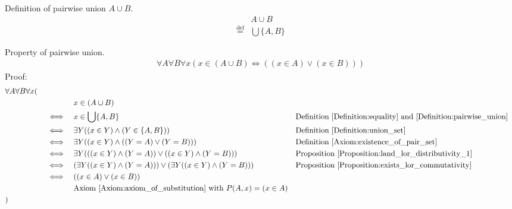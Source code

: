 \begin{defn}
\label{Definition:pairwise_union}
Definition of pairwise union $A \cup B$.
\begin{align*}
& A \cup B \\
\overset{\operatorname{def}}{=} & \bigcup \{ A,B \}
\end{align*}
\end{defn}

\begin{prop}
\label{Proposition:pairwise_union_property}
Property of pairwise union.
\begin{align*}
\forall A \forall B \forall x (x \in (A \cup B) \iff ((x \in A) \lor (x \in B)))
\end{align*}
Proof:
\begin{align*}
& \forall A \forall B \forall x ( \\
& \quad && && x \in (A \cup B) \\
& \quad && \iff && x \in  \bigcup \{ A,B \}
&& \text{Definition \ref{Definition:equality} and \ref{Definition:pairwise_union}} \\
& \quad && \iff && \exists Y ((x \in Y) \land (Y \in \{ A,B \} ))
&& \text{Definition \ref{Definition:union_set}} \\
& \quad && \iff && \exists Y ((x \in Y) \land ((Y = A) \lor (Y = B) ))
&& \text{Definition \ref{Axiom:existence_of_pair_set}} \\
& \quad && \iff && \exists Y( ((x \in Y) \land (Y = A)) \lor ((x \in Y) \land (Y = B)) )
&& \text{Proposition \ref{Proposition:land_lor_distributivity_1}} \\
& \quad && \iff && (\exists Y ((x \in Y) \land (Y = A))) \lor (\exists Y ((x \in Y) \land (Y = B)))
&& \text{Proposition \ref{Proposition:exists_lor_commutativity}} \\
& \quad && \iff && ((x \in A) \lor (x \in B)) \\
& \quad && && \text{Axiom \ref{Axiom:axiom_of_substitution} with $P(A,x) = (x \in A)$} \\
& )
\end{align*}
\end{prop}


